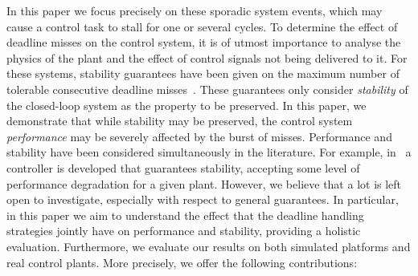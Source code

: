 In this paper we focus precisely on these sporadic system events, which may cause a control task to stall for one or several cycles.
To determine the effect of deadline misses on the control system, it is of utmost importance to analyse the physics of the plant and the effect of control signals not being delivered to it.
For these systems, stability guarantees have been given on the maximum number of tolerable consecutive deadline misses~\cite{Maggio:2020}.
These guarantees only consider \emph{stability} of the closed-loop system as the property to be preserved.
In this paper, we demonstrate that while stability may be preserved, the control system \emph{performance} may be severely affected by the burst of misses.
Performance and stability have been considered simultaneously in the literature.
For example, in~\cite{Chakraborty:2018} a controller is developed that guarantees stability, accepting some level of performance degradation for a given plant.
However, we believe that a lot is left open to investigate, especially with respect to general guarantees.
In particular, in this paper we aim to understand the effect that the deadline handling strategies jointly have on performance and stability, providing a holistic evaluation.
Furthermore, we evaluate our results on both simulated platforms and real control plants.
More precisely, we offer the following contributions:
%
